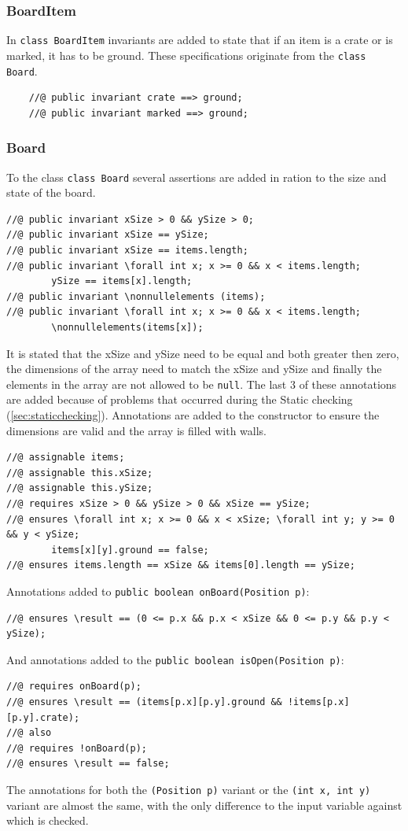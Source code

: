 \documentclass[a4paper]{article}
\begin{document}
	\subsubsection{BoardItem}
	In \texttt{class BoardItem} invariants are added to state that if an item is a crate or is marked, it has to be ground. These specifications originate from the \texttt{class Board}.
	\begin{lstlisting}
	//@ public invariant crate ==> ground;
	//@ public invariant marked ==> ground;
	\end{lstlisting}
	
	\subsubsection{Board}
	To the class \texttt{class Board} several assertions are added in ration to the size and state of the board.
	\begin{lstlisting}
//@ public invariant xSize > 0 && ySize > 0;
//@ public invariant xSize == ySize;
//@ public invariant xSize == items.length;
//@ public invariant \forall int x; x >= 0 && x < items.length; 
		ySize == items[x].length;
//@ public invariant \nonnullelements (items);
//@ public invariant \forall int x; x >= 0 && x < items.length; 
		\nonnullelements(items[x]);
	\end{lstlisting}
	It is stated that the xSize and ySize need to be equal and both greater then zero, the dimensions of the array need to match the xSize and ySize and finally the elements in the array are not allowed to be \texttt{null}. The last 3 of these annotations are added because of problems that occurred during the Static checking (\ref{sec:staticchecking}).
	Annotations are added to the constructor to ensure the dimensions are valid and the array is filled with walls.
	\begin{lstlisting}
//@ assignable items;
//@ assignable this.xSize;
//@ assignable this.ySize;
//@ requires xSize > 0 && ySize > 0 && xSize == ySize;
//@ ensures \forall int x; x >= 0 && x < xSize; \forall int y; y >= 0 && y < ySize; 
		items[x][y].ground == false;
//@ ensures items.length == xSize && items[0].length == ySize;
	\end{lstlisting}
	Annotations added to \texttt{public boolean onBoard(Position p)}:
	\begin{lstlisting}
//@ ensures \result == (0 <= p.x && p.x < xSize && 0 <= p.y && p.y < ySize);
	\end{lstlisting}
	And annotations added to the \texttt{public boolean isOpen(Position p)}:
	\begin{lstlisting}
//@ requires onBoard(p);
//@ ensures \result == (items[p.x][p.y].ground && !items[p.x][p.y].crate);
//@ also
//@ requires !onBoard(p);
//@ ensures \result == false;
	\end{lstlisting}
	The annotations for both the \texttt{(Position p)} variant or the \texttt{(int x, int y)} variant are almost the same, with the only difference to the input variable against which is checked.
	
\end{document}
